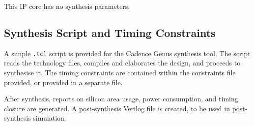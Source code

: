 \else

This IP core has no synthesis parameters.

\fi


\subsection{Synthesis Script and Timing Constraints}

A simple {\tt .tcl} script is provided for the Cadence Genus synthesis tool. The
script reads the technology files, compiles and elaborates the design, and
proceeds to synthesise it. The timing constraints are contained within the
constraints file provided, or provided in a separate file.

After synthesis, reports on silicon area usage, power consumption, and timing
closure are generated. A post-synthesis Verilog file is created, to be used in
post-synthesis simulation.


